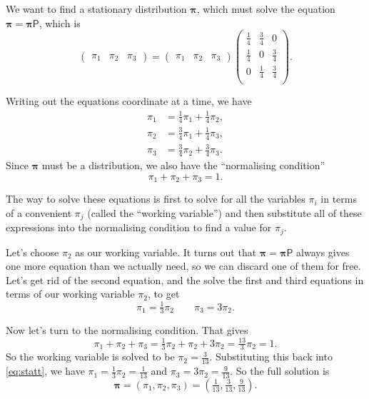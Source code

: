 \documentclass[
  a4paper,
]{article}
\theoremstyle{definition}
\theoremstyle{definition}
\theoremstyle{definition}
\theoremstyle{remark}
\begin{document}
We want to find a stationary distribution \(\boldsymbol \pi\), which must solve the equation \(\boldsymbol \pi =\boldsymbol \pi\mathsf P\), which is
\[ \begin{pmatrix} \pi_1 & \pi_2 & \pi_3 \end{pmatrix}  = \begin{pmatrix} \pi_1 & \pi_2 & \pi_3 \end{pmatrix}  \begin{pmatrix}
    \tfrac14 &\tfrac34 & 0\\
    \tfrac14 &0 & \tfrac34\\
    0 &\tfrac14 & \tfrac34\\
    \end{pmatrix} .\]

Writing out the equations coordinate at a time, we have
\begin{align*}
    \pi_1 &= \tfrac14\pi_1+\tfrac14\pi_2 , \\
    \pi_2 &= \tfrac34\pi_1+\tfrac14\pi_3 , \\
    \pi_3 &= \tfrac34\pi_2+\tfrac34\pi_3 . 
    \end{align*}
Since \(\boldsymbol\pi\) must be a distribution, we also have the ``normalising condition''
\[ \pi_1+\pi_2+\pi_3=1 . \]

The way to solve these equations is first to solve for all the variables \(\pi_i\) in terms of a convenient \(\pi_{j}\) (called the ``working variable'') and then substitute all of these expressions into the normalising condition to find a value for \(\pi_{j}\).

Let's choose \(\pi_2\) as our working variable. It turns out that \(\boldsymbol\pi = \boldsymbol\pi \mathsf{P}\) always gives one more equation than we actually need, so we can discard one of them for free. Let's get rid of the second equation, and the solve the first and third equations in terms of our working variable \(\pi_2\), to get
\begin{equation}
\pi_1=\tfrac13\pi_2 \qquad \pi_3=3\pi_2 . \label{eq:statt}
\end{equation}

Now let's turn to the normalising condition. That gives
\[ \pi_1+\pi_2+\pi_3 = \tfrac13\pi_2+\pi_2+3\pi_2 = \tfrac{13}{3} \pi_2 = 1 .\]
So the working variable is solved to be \(\pi_2 = \frac{3}{13}\). Substituting this back into \eqref{eq:statt}, we have \(\pi_1=\tfrac13\pi_2 = \frac{1}{13}\) and \(\pi_3=3\pi_2 = \frac{9}{13}\). So the full solution is
\[ \boldsymbol \pi = (\pi_1, \pi_2, \pi_3) = \left(\tfrac{1}{13}, \tfrac{3}{13}, \tfrac{9}{13}\right). \]
\end{document}
